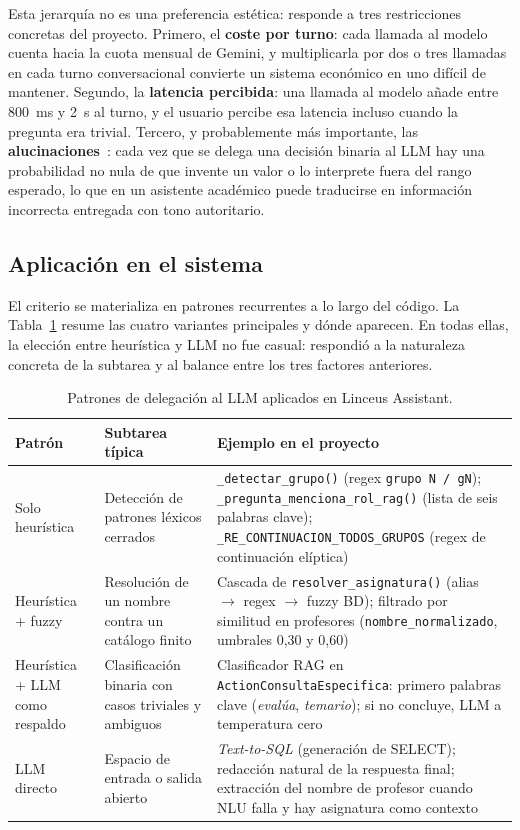 Esta jerarquía no es una preferencia estética: responde a tres restricciones concretas del proyecto. Primero, el \textbf{coste por turno}: cada llamada al modelo cuenta hacia la cuota mensual de Gemini, y multiplicarla por dos o tres llamadas en cada turno conversacional convierte un sistema económico en uno difícil de mantener. Segundo, la \textbf{latencia percibida}: una llamada al modelo añade entre 800~ms y 2~s al turno, y el usuario percibe esa latencia incluso cuando la pregunta era trivial. Tercero, y probablemente más importante, las \textbf{alucinaciones}~\cite{ji2023survey}: cada vez que se delega una decisión binaria al LLM hay una probabilidad no nula de que invente un valor o lo interprete fuera del rango esperado, lo que en un asistente académico puede traducirse en información incorrecta entregada con tono autoritario.

\subsection{Aplicación en el sistema}

El criterio se materializa en patrones recurrentes a lo largo del código. La Tabla~\ref{tab:politica-llm} resume las cuatro variantes principales y dónde aparecen. En todas ellas, la elección entre heurística y LLM no fue casual: respondió a la naturaleza concreta de la subtarea y al balance entre los tres factores anteriores.

\begin{table}[hbtp]
\centering
\small
\begin{tabular}{|p{3.4cm}|>{\raggedright\arraybackslash}p{4.5cm}|>{\raggedright\arraybackslash}p{6cm}|}
\hline
\textbf{Patrón} & \textbf{Subtarea típica} & \textbf{Ejemplo en el proyecto} \\
\hline
Solo heurística & Detección de patrones léxicos cerrados & \texttt{\_detectar\_grupo()} (regex \texttt{grupo N / gN}); \texttt{\_pregunta\_menciona\_rol\_rag()} (lista de seis palabras clave); \texttt{\_RE\_CONTINUACION\_TODOS\_GRUPOS} (regex de continuación elíptica) \\
\hline
Heurística + fuzzy & Resolución de un nombre contra un catálogo finito & Cascada de \texttt{resolver\_asignatura()} (alias $\rightarrow$ regex $\rightarrow$ fuzzy BD); filtrado por similitud en profesores (\texttt{nombre\_normalizado}, umbrales 0,30 y 0,60) \\
\hline
Heurística + LLM como respaldo & Clasificación binaria con casos triviales y ambiguos & Clasificador RAG en \texttt{ActionConsultaEspecifica}: primero palabras clave (\textit{evalúa}, \textit{temario}); si no concluye, LLM a temperatura cero \\
\hline
LLM directo & Espacio de entrada o salida abierto & \textit{Text-to-SQL} (generación de SELECT); redacción natural de la respuesta final; extracción del nombre de profesor cuando NLU falla y hay asignatura como contexto \\
\hline
\end{tabular}
\caption{Patrones de delegación al LLM aplicados en Linceus Assistant.}
\label{tab:politica-llm}
\end{table}

